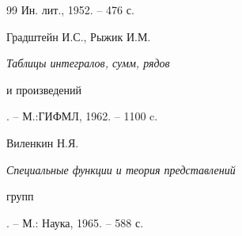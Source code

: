 \begin{thebibliography}{99}
Ин. лит., 1952. -- 476 с. 




Градштейн И.С., Рыжик И.М. {\em Таблицы интегралов, сумм, рядов 


и произведений}. -- М.:\linebreak ГИФМЛ, 1962. -- 1100 c. 




Виленкин Н.Я. {\em Специальные функции и теория представлений  


групп}. -- М.: Наука, 1965. -- 588 с. 


 


 


\end{thebibliography} 


 


\vskip 2cm 


 






 


\label{end} 


 


